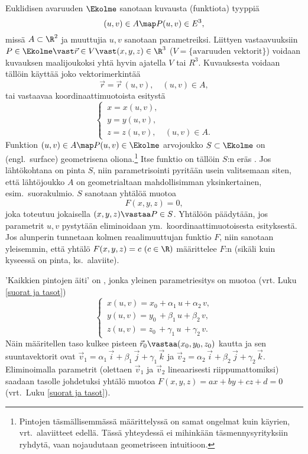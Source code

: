 Euklidisen avaruuden $\Ekolme$  sanotaan kuvausta (funktiota)
tyyppiä
\[
(u,v) \in A \map P(u,v) \in E^3,
\]
missä $A \subset \R^2$ ja muuttujia $u,v$ sanotaan parametreiksi. Liittyen vastaavuuksiin 
$P \in \Ekolme \vast \vec{r} \in V \vast (x,y,z) \in \R^3$
($V = \{\text{avaruuden vektorit}\}$) voidaan kuvauksen maalijoukoksi yhtä hyvin ajatella $V$
tai $R^3$. Kuvauksesta voidaan tällöin käyttää joko vektorimerkintää
\[
\vec r=\vec r\,(u,v),\quad (u,v)\in A,
\]
tai vastaavaa koordinaattimuotoista esitystä
\[
\begin{cases}
\,x=x(u,v), \\
\,y=y(u,v), \\
\,z=z(u,v), &(u,v)\in A.
\end{cases}
\]
%
Funktion $(u,v) \in A \map P(u,v) \in \Ekolme$ arvojoukko $S \subset \Ekolme$ on 
(engl.\ surface) geometrisena oliona.\footnote[2]{Pintojen täsmällisemmässä määrittelyssä
on samat ongelmat kuin käyrien, vrt.\ alaviitteet edellä. Tässä yhteydessä ei mihinkään
täsmennysyrityksiin ryhdytä, vaan nojaudutaan geometriseen intuitioon.}
Itse funktio on tällöin $S$:n eräs . Jos lähtökohtana on pinta $S$, niin
parametrisointi pyritään usein valitsemaan siten, että lähtöjoukko $A$ on geometrialtaan 
mahdollisimman yksinkertainen, esim.\ suorakulmio. 
 $S$  sanotaan yhtälöä muotoa
\[ 
F(x,y,z) = 0, 
\]
joka toteutuu jokaisella $(x,y,z) \vastaa P \in S$. Yhtälöön päädytään, jos parametrit $u,v$
pystytään eliminoidaan ym.\ koordinaattimuotoisesta esityksestä. Jos alunperin tunnetaan kolmen
reaalimuuttujan funktio $F$, niin sanotaan yleisemmin, että yhtälö $F(x,y,z) = c\ (c \in \R)$
%
määrittelee $F$:n  (sikäli kuin kyseessä on pinta, ks.\ alaviite).
\begin{Exa} 'Kaikkien pintojen äiti' on , jonka yleinen parametriesitys on muotoa 
(vrt. Luku \ref{suorat ja tasot})
\[ \begin{cases} 
    \,x(u,v) = x_0 + \alpha_1\,u + \alpha_2\,v, \\ 
    \,y(u,v) = y_0\,+ \beta_1\,u + \beta_2\,v, \\ 
    \,z(u,v) = z_0\,+ \gamma_1\,u\,+ \gamma_2\,v.
   \end{cases} \]
Näin määritellen taso kulkee pisteen $\vec r_0\vastaa (x_0,y_0,z_0)$ kautta ja sen 
suuntavektorit ovat $\vec v_1 = \alpha_1\,\vec i + \beta_1\,\vec j + \gamma_1\,\vec k$ ja 
$\vec v_2 = \alpha_2\,\vec i + \beta_2\,\vec j + \gamma_2\,\vec k$. Eliminoimalla parametrit 
(olettaen $\vec v_1$ ja $\vec v_2$ lineaarisesti riippumattomiksi) saadaan tasolle johdetuksi
yhtälö muotoa $F(x,y,z)=ax+by+cz+d=0$ (vrt.\ Luku \ref{suorat ja tasot}). \loppu
\end{Exa}
